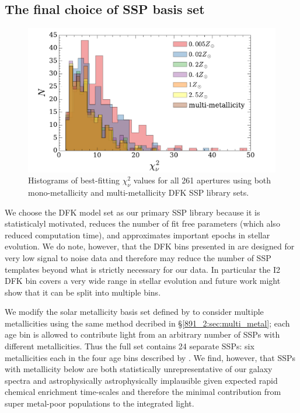 \subsection{The final choice of SSP basis set}
\label{891_2:sec:final_SSP}
\begin{figure}
  \centering
  \includegraphics[width=\columnwidth]{891_2/figs/dfk_chihist.pdf}
  \caption[$\chi_{\nu}^2$ distributions for different metallcity
    fits]{\fixspacing\label{891_2:fig:chisq_hist}Histograms of
    best-fitting $\chi^2_\nu$ values for all 261 apertures using both
    mono-metallicity and multi-metallicity DFK SSP library sets.}
\end{figure}

We choose the  DFK model set as our primary SSP
library because it is statisticalyl motivated, reduces the number of
fit free parameters (which also reduced computation time), and
approximates important epochs in stellar evolution. We do note,
however, that the DFK bins presented in  are
designed for very low signal to noise data and therefore may reduce
the number of SSP templates beyond what is strictly necessary for our
data. In particular the I2 DFK bin covers a very wide range in stellar
evolution and future work might show that it can be split into
multiple bins.


We modify the solar metallicity basis set defined by
 to consider multiple metallicities using the same
method decribed in \S\ref{891_2:sec:multi_metal}; each age bin is allowed to
contribute light from an arbitrary number of SSPs with different
metallicities. Thus the full set contains 24 separate SSPs: six
metallicities each in the four age bins described by
. We find, however, that SSPs with metallicity
below  are both statistically unrepresentative of our
galaxy spectra and astrophysically astrophysically implausible given
expected rapid chemical enrichment time-scales and therefore the
minimal contribution from super metal-poor populations to the
integrated light.

